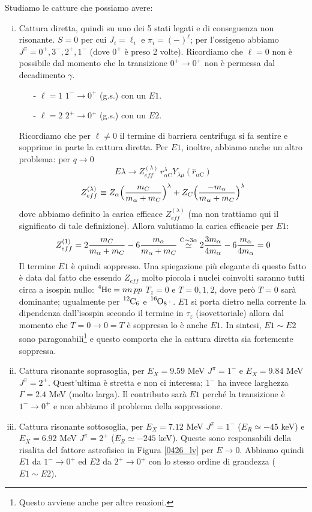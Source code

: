 \noindent Studiamo le catture che possiamo avere:
\begin{enumerate}[i.]
	\item Cattura diretta, quindi su uno dei 5 stati legati e di conseguenza non risonante. $S=0$ per cui $J_i = \ell_i$ e $\pi_i = (-)^\ell$; per l'ossigeno abbiamo $J^\pi = 0^+,3^-,2^+,1^-$ (dove $0^+$ è preso 2 volte). Ricordiamo che $\ell=0$ non è possibile dal momento che la transizione $0^+\to0^+$ non è permessa dal decadimento $\gamma$.
	\begin{itemize}
		\item[-] $\ell =1$ $1^-\to0^+$ (g.s.) con un $E1$.
		\item[-] $\ell=2$ $2^+\to0^+$ (g.s.) con un $E2$. 
	\end{itemize}
	Ricordiamo che per $\ell\not = 0$ il termine di barriera centrifuga si fa sentire e sopprime in parte la cattura diretta. Per $E1$, inoltre, abbiamo anche un altro problema: per $q\to0$ 
	$$E\lambda \to Z_{eff}^{(\lambda)}\,r_{\alpha\mbox{C}}^\lambda Y_{\lambda \mu}(\hat{r}_{\alpha\mbox{C}})$$
	$$Z_{eff}^{(\lambda)} \equiv Z_\alpha \Bigl ( \frac{m_{C}}{m_\alpha + m_{C}} \Bigr )^\lambda + Z_C \Bigl ( \frac{-m_\alpha}{m_\alpha+m_C} \Bigr )^\lambda$$
	dove abbiamo definito la carica efficace $Z_{eff}^{(\lambda)}$ (ma non trattiamo qui il significato di tale definizione). Allora valutiamo la carica efficacie per $E1$:
	$$Z_{eff}^{(1)} = 2{\frac{m_{C}}{m_\alpha + m_{C}}} - 6 {\frac{m_\alpha}{m_\alpha+m_C}} \stackrel{\ce{C}\sim 3\alpha}{\simeq} 2 \frac{3m_\alpha}{4m_\alpha} - 6 \frac{m_\alpha}{4m_\alpha} = 0$$
	Il termine $E1$ è quindi soppresso. Una spiegazione più elegante di questo fatto è data dal fatto che essendo $Z_{eff}$ molto piccola i nuclei coinvolti saranno tutti circa a isospin nullo: $\ce{^4He} = nn\, pp$ $T_z=0$ e $T=0,1,2$, dove però $T=0$ sarà dominante; ugualmente per $\ce{^12C_6}$ e $\ce{^{16}O_8.}$. $E1$ si porta dietro nella corrente la dipendenza dall'isospin secondo il termine in $\tau_z$ (isovettoriale) allora dal momento che $T=0\to0=T$ è soppressa lo è anche $E1$. In sintesi, $E1\sim E2$ sono paragonabili\footnote{Questo avviene anche per altre reazioni.} %
	e questo comporta che la cattura diretta sia fortemente soppressa.
	\item Cattura risonante soprasoglia, per $E_X = 9.59$ MeV $J^\pi = 1^-$ e $E_X = 9.84$ MeV $J^\pi = 2^+$. Quest'ultima è stretta e non ci interessa; $1^-$ ha invece larghezza $\Gamma=2.4$ MeV (molto larga). Il contributo sarà $E1$ perché la transizione è $1^-\to0^+$ e non abbiamo il problema della soppressione.
	\item Cattura risonante sottosoglia, per $E_X = 7.12$ MeV $J^\pi =1^-$ ($E_R\simeq -45$ keV) e $E_X = 6.92$ MeV $J^\pi =2^+$ ($E_R\simeq -245$ keV). Queste sono responsabili della risalita del fattore astrofisico in Figura \ref{0426_lv} per $E\to0$. Abbiamo quindi $E1$ da $1^-\to0^+$ ed $E2$ da $2^+\to0^+$ con lo stesso ordine di grandezza ($E1\sim E2$).
\end{enumerate}

